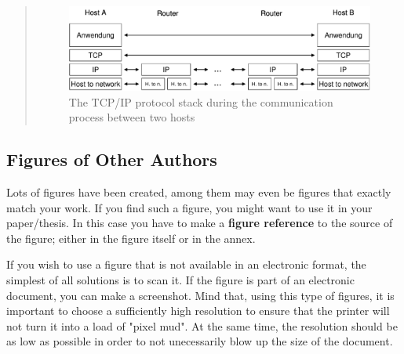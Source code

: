 \begin{quotation}

  \begin{figure}
    \begin{center}
      \includegraphics[width=\textwidth]{fig/communication}
      \caption{The TCP/IP protocol stack during the communication process 
        between two hosts}
      \label{fig:1}
    \end{center}
  \end{figure}
  
\end{quotation}

  
\subsection*{Figures of Other Authors}

Lots of figures have been created, among them may even be figures that
exactly match your work. If you find such a figure, you might want to use
it in your paper/thesis. In this case you have to make a \textbf{figure reference}
to the source of the figure; either in the figure itself or in the annex.

If you wish to use a figure that is not available in an electronic format,
the simplest of all solutions is to scan it. If the figure is part of an 
electronic document, you can make a screenshot. Mind that, using this type
of figures, it is important to choose a sufficiently high resolution to ensure
that the printer will not turn it into a load of "pixel mud".
At the same time, the resolution should be as low as possible in order to not
unecessarily blow up the size of the document.

